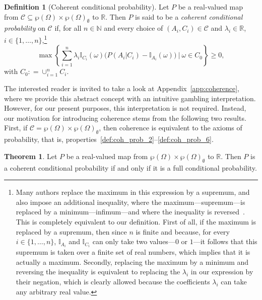\documentclass[10pt,a4paper]{paper}
\theoremstyle{definition}
\newtheorem{theorem}{Theorem}[section]
\newtheorem{definition}{Definition}
\newcommand{\reals}{\mathbb{R}}
\newcommand{\paths}{\Omega}
\newcommand{\power}{\wp(\paths)}
\newcommand{\nonemptypower}{\power_{\emptyset}}
\newcommand{\ind}[1]{\mathbb{I}_{#1}}
\newcommand{\coloneqq}{:\!=}
\begin{document}
\begin{definition}[Coherent conditional probability]\label{def:coherence}
Let $P$ be a real-valued map from $\mathcal{C}\subseteq\power\times\nonemptypower$ to $\reals$. Then $P$ is said to be a \emph{coherent conditional probability} on $\mathcal{C}$ if, for all $n\in\mathbb{N}$ and every choice of $(A_i,C_i)\in\mathcal{C}$ and $\lambda_i\in\reals$, $i\in\{1,\dots,n\}$,\footnote{Many authors replace the maximum in this expression by a supremum, and also impose an additional inequality, where the maximum---supremum---is replaced by a minimum---infimum---and where the inequality is reversed~\cite{berti2002coherent,berti1991coherent,regazzini1985finitely}. This is completely equivalent to our definition. First of all, if the maximum is replaced by a supremum, then since $n$ is finite and because, for every $i\in\{1,\dots,n\}$, $\ind{A_i}$ and $\ind{C_i}$ can only take two values---$0$ or $1$---it follows that this supremum is taken over a finite set of real numbers, which implies that it is actually a maximum. Secondly, replacing the maximum by a minimum and reversing the inequality is equivalent to replacing the $\lambda_i$ in our expression by their negation, which is clearly allowed because the coefficients $\lambda_i$ can take any arbitrary real value.}
\begin{equation*}
\max\left\{\sum_{i=1}^n\lambda_i\ind{C_i}(\omega)\bigl(P(A_i\vert C_i)-\ind{A_i}(\omega)\bigr)~\Bigg\vert~\omega\in C_0\right\}\geq0,
\end{equation*}
with $C_0\coloneqq\cup_{i=1}^nC_i$.
\end{definition}
The interested reader is invited to take a look at Appendix~\ref{app:coherence}, where we provide this abstract concept with an intuitive gambling interpretation. However, for our present purposes, this interpretation is not required. Instead, our motivation for introducing coherence stems from the following two results. First, if $\mathcal{C}=\power\times\nonemptypower$, then coherence is equivalent to the axioms of probability, that is, properties~\ref{def:coh_prob_2}--\ref{def:coh_prob_6}.%
\begin{theorem}{\cite[Theorem 3]{regazzini1985finitely}}\label{theo:fullcoherent}
Let $P$ be a real-valued map from $\power\times\nonemptypower$ to $\reals$. Then $P$ is a coherent conditional probability if and only if it is a full conditional probability.
\end{theorem}
\end{document}
